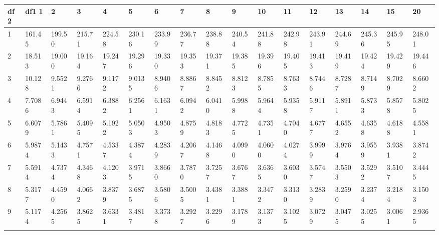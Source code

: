  {
 \fontsize{6pt}{6pt}
 \selectfont

\begin{tabular}{|m{8pt}|m{18pt}*{15}{m{18pt}}}\hline 
df2  & df1      1  &      2  &      3  &      4  &      5  &      6  &      7  &      8  &      9  &     10  &     11  &     12  &     13  &     14  &     15  &     20   \\ \hline 
  1 & 161.45 & 199.50 & 215.71 & 224.58 & 230.16 & 233.99 & 236.77 & 238.88 & 240.54 & 241.88 & 242.98 & 243.91 & 244.69 & 245.36 & 245.95 & 248.01 \\[2pt] \arrayrulecolor{light-gray}\hline\arrayrulecolor{black}  
  2 & 18.513 & 19.000 & 19.164 & 19.247 & 19.296 & 19.330 & 19.353 & 19.371 & 19.385 & 19.396 & 19.405 & 19.413 & 19.419 & 19.424 & 19.429 & 19.446 \\[2pt] \arrayrulecolor{light-gray}\hline\arrayrulecolor{black}  
  3 & 10.128 & 9.5521 & 9.2766 & 9.1172 & 9.0135 & 8.9406 & 8.8867 & 8.8452 & 8.8123 & 8.7855 & 8.7633 & 8.7446 & 8.7287 & 8.7149 & 8.7029 & 8.6602 \\[2pt] \arrayrulecolor{light-gray}\hline\arrayrulecolor{black}  
  4 & 7.7086 & 6.9443 & 6.5914 & 6.3882 & 6.2561 & 6.1631 & 6.0942 & 6.0410 & 5.9988 & 5.9644 & 5.9358 & 5.9117 & 5.8911 & 5.8733 & 5.8578 & 5.8025 \\[2pt] \arrayrulecolor{light-gray}\hline\arrayrulecolor{black}  
  5 & 6.6079 & 5.7861 & 5.4095 & 5.1922 & 5.0503 & 4.9503 & 4.8759 & 4.8183 & 4.7725 & 4.7351 & 4.7040 & 4.6777 & 4.6552 & 4.6358 & 4.6188 & 4.5581 \\[2pt] \arrayrulecolor{light-gray}\hline\arrayrulecolor{black}  
  6 & 5.9874 & 5.1433 & 4.7571 & 4.5337 & 4.3874 & 4.2839 & 4.2067 & 4.1468 & 4.0990 & 4.0600 & 4.0274 & 3.9999 & 3.9764 & 3.9559 & 3.9381 & 3.8742 \\[2pt] \arrayrulecolor{light-gray}\hline\arrayrulecolor{black}  
  7 & 5.5914 & 4.7374 & 4.3468 & 4.1203 & 3.9715 & 3.8660 & 3.7870 & 3.7257 & 3.6767 & 3.6365 & 3.6030 & 3.5747 & 3.5503 & 3.5292 & 3.5107 & 3.4445 \\[2pt] \arrayrulecolor{light-gray}\hline\arrayrulecolor{black}  
  8 & 5.3177 & 4.4590 & 4.0662 & 3.8379 & 3.6875 & 3.5806 & 3.5005 & 3.4381 & 3.3881 & 3.3472 & 3.3130 & 3.2839 & 3.2590 & 3.2374 & 3.2184 & 3.1503 \\[2pt] \arrayrulecolor{light-gray}\hline\arrayrulecolor{black}  
  9 & 5.1174 & 4.2565 & 3.8625 & 3.6331 & 3.4817 & 3.3738 & 3.2927 & 3.2296 & 3.1789 & 3.1373 & 3.1025 & 3.0729 & 3.0475 & 3.0255 & 3.0061 & 2.9365 \\[2pt] \arrayrulecolor{light-gray}\hline\arrayrulecolor{black}  

\end{tabular}}
